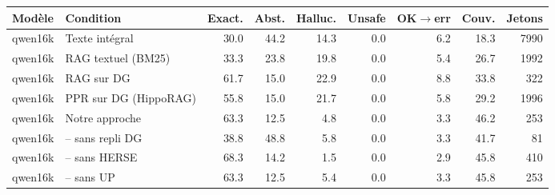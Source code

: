 \begin{tabular}{llrrrrrrr}
\hline
Modèle & Condition & Exact. & Abst. & Halluc. & Unsafe & OK$\rightarrow$err & Couv. & Jetons \\
\hline
qwen16k & Texte intégral & 30.0 & 44.2 & 14.3 & 0.0 & 6.2 & 18.3 & 7990 \\
qwen16k & RAG textuel (BM25) & 33.3 & 23.8 & 19.8 & 0.0 & 5.4 & 26.7 & 1992 \\
qwen16k & RAG sur DG & 61.7 & 15.0 & 22.9 & 0.0 & 8.8 & 33.8 & 322 \\
qwen16k & PPR sur DG (HippoRAG) & 55.8 & 15.0 & 21.7 & 0.0 & 5.8 & 29.2 & 1996 \\
qwen16k & Notre approche & 63.3 & 12.5 & 4.8 & 0.0 & 3.3 & 46.2 & 253 \\
qwen16k & -- sans repli DG & 38.8 & 48.8 & 5.8 & 0.0 & 3.3 & 41.7 & 81 \\
qwen16k & -- sans HERSE & 68.3 & 14.2 & 1.5 & 0.0 & 2.9 & 45.8 & 410 \\
qwen16k & -- sans UP & 63.3 & 12.5 & 5.4 & 0.0 & 3.3 & 45.8 & 253 \\
\hline
\end{tabular}